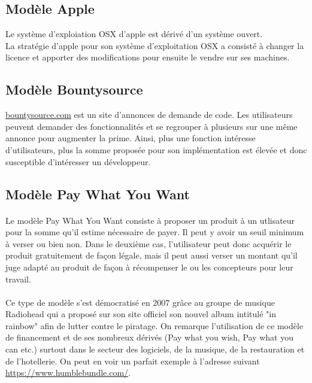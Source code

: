     \subsection{Modèle Apple}

Le système d'exploiation OSX d'apple est dérivé d'un système ouvert.\\
La stratégie d'apple pour son système d'exploitation OSX a consisté à changer la
licence et apporter des modifications pour ensuite le vendre sur ses machines.

    \subsection{Modèle Bountysource}

\url{bountysource.com} est un site d'annonces de demande de code. Les
utilisateurs peuvent demander des fonctionnalités et se regrouper à plusieurs
sur une même annonce pour augmenter la prime. Ainsi, plus une fonction intéresse
d'utilisateurs, plus la somme proposée pour son implémentation est élevée et
donc susceptible d'intéresser un développeur.

    \subsection{Modèle Pay What You Want}
    \paragraph{}
    Le modèle Pay What You Want consiste à proposer un produit à un utlisateur pour la somme qu'il estime nécessaire de payer. Il peut y avoir un seuil minimum à verser ou bien non. Dans le deuxième cas, l'utilisateur peut donc acquérir le produit gratuitement de façon légale, mais il peut aussi verser un montant qu'il juge adapté au produit de façon à récompenser le ou les concepteurs pour leur travail.
    \paragraph{}
    Ce type de modèle s'est démocratisé en 2007 grâce au groupe de musique Radiohead qui a proposé sur son site officiel son nouvel album intitulé "in rainbow" afin de lutter contre le piratage. On remarque l'utilisation de ce modèle de financement et de ses nombreux dérivés (Pay what you wish, Pay what you can etc.) surtout dans le secteur des logiciels, de la musique, de la restauration et de l'hotellerie. On peut en voir un parfait exemple à l'adresse suivant \url{https://www.humblebundle.com/}.

\paragraph{}
